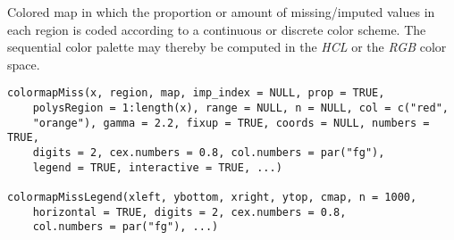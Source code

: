 %
\begin{Description}\relax
Colored map in which the proportion or amount of missing/imputed values in each 
region is coded according to a continuous or discrete color scheme.  The 
sequential color palette may thereby be computed in the \emph{HCL} or the 
\emph{RGB} color space.
\end{Description}
%
\begin{Usage}
\begin{verbatim}
colormapMiss(x, region, map, imp_index = NULL, prop = TRUE,
    polysRegion = 1:length(x), range = NULL, n = NULL, col = c("red",
    "orange"), gamma = 2.2, fixup = TRUE, coords = NULL, numbers = TRUE,
    digits = 2, cex.numbers = 0.8, col.numbers = par("fg"),
    legend = TRUE, interactive = TRUE, ...)

colormapMissLegend(xleft, ybottom, xright, ytop, cmap, n = 1000,
    horizontal = TRUE, digits = 2, cex.numbers = 0.8,
    col.numbers = par("fg"), ...)
\end{verbatim}
\end{Usage}
%
